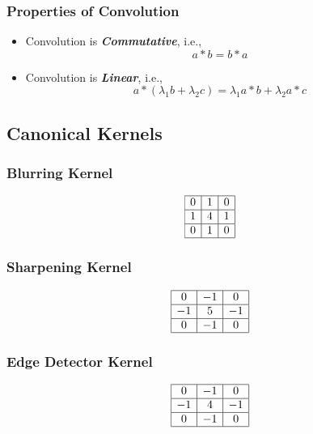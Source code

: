 \documentclass[11pt]{article}
\begin{document}
\subsubsection{Properties of Convolution}
\begin{itemize}
    \item Convolution is \textit{\textbf{Commutative}}, i.e.,
        \begin{equation}
            a * b=b * a
        \end{equation} 
    \item Convolution is \textit{\textbf{Linear}}, i.e., 
        \begin{equation}
            a *\left(\lambda_{1} b+\lambda_{2} c\right)=\lambda_{1} a * b+\lambda_{2} a * c
        \end{equation}
\end{itemize}

\subsection{Canonical Kernels}
\subsubsection{Blurring Kernel}
\begin{equation}
    \begin{array}{|c|c|c|}
        \hline 0 & {1} & {0} \\
        \hline 1 & {4} & {1} \\
        \hline 0 & {1} & {0} \\
        \hline
    \end{array}
\end{equation}

\subsubsection{Sharpening Kernel}
\begin{equation}
    \begin{array}{|c|c|c|}
        \hline 0 & {-1} & {0} \\
        \hline -1 & {5} & {-1} \\
        \hline 0 & {-1} & {0} \\
        \hline
    \end{array}
\end{equation}

\subsubsection{Edge Detector Kernel}
\begin{equation}
    \begin{array}{|c|c|c|}
        \hline 0 & {-1} & {0} \\
        \hline-1 & {4} & {-1} \\
        \hline 0 & {-1} & {0} \\
        \hline
    \end{array}
\end{equation}
\end{document}
